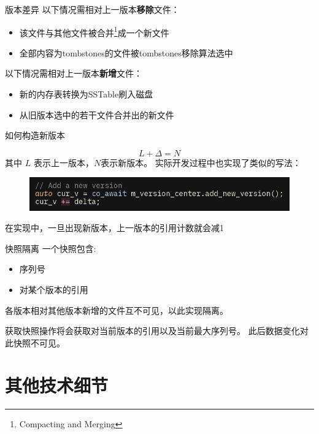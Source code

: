\documentclass{beamer}
\begin{document}
\begin{frame}{版本差异}
    以下情况需相对上一版本\textbf{移除}文件：
    \begin{itemize}
        \item 该文件与其他文件被合并\footnote{Compacting and Merging}成一个新文件
        \item 全部内容为tombstones的文件被tombstones移除算法选中
    \end{itemize}

    \pause

    以下情况需相对上一版本\textbf{新增}文件：
    \begin{itemize}
        \item 新的内存表转换为SSTable刷入磁盘
        \item 从旧版本选中的若干文件合并出的新文件
    \end{itemize}
\end{frame}

\begin{frame}{如何构造新版本}

    \begin{equation*}
        L + \Delta = N
    \end{equation*}
    其中 $L$ 表示上一版本，$N$表示新版本。
    实际开发过程中也实现了类似的写法：
    \begin{figure}
        \centering
        \includegraphics[width=0.8\linewidth]{pic/add-new-ver.png}
    \end{figure}
    在实现中，一旦出现新版本，上一版本的引用计数就会减1
\end{frame}

\begin{frame}{快照隔离}
    一个快照包含:
    \begin{itemize}
        \item 序列号
        \item 对某个版本的引用
    \end{itemize}
    各版本相对其他版本新增的文件互不可见，以此实现隔离。

    获取快照操作将会获取对当前版本的引用以及当前最大序列号。
    此后数据变化对此快照不可见。
\end{frame}

\section{其他技术细节}
\end{document}
